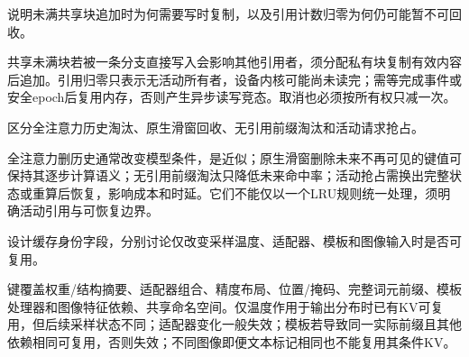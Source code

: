 \begin{exercises}
\begin{exercise} 说明未满共享块追加时为何需要写时复制，以及引用计数归零为何仍可能暂不可回收。

\begin{solution}
共享未满块若被一条分支直接写入会影响其他引用者，须分配私有块复制有效内容后追加。引用归零只表示无活动所有者，设备内核可能尚未读完；需等完成事件或安全epoch后复用内存，否则产生异步读写竞态。取消也必须按所有权只减一次。
\end{solution}
\end{exercise}

\begin{exercise} 区分全注意力历史淘汰、原生滑窗回收、无引用前缀淘汰和活动请求抢占。

\begin{solution}
全注意力删历史通常改变模型条件，是近似；原生滑窗删除未来不再可见的键值可保持其逐步计算语义；无引用前缀淘汰只降低未来命中率；活动抢占需换出完整状态或重算后恢复，影响成本和时延。它们不能仅以一个LRU规则统一处理，须明确活动引用与可恢复边界。
\end{solution}
\end{exercise}

\begin{exercise} 设计缓存身份字段，分别讨论仅改变采样温度、适配器、模板和图像输入时是否可复用。

\begin{solution}
键覆盖权重/结构摘要、适配器组合、精度布局、位置/掩码、完整词元前缀、模板处理器和图像特征依赖、共享命名空间。仅温度作用于输出分布时已有KV可复用，但后续采样状态不同；适配器变化一般失效；模板若导致同一实际前缀且其他依赖相同可复用，否则失效；不同图像即便文本标记相同也不能复用其条件KV。
\end{solution}
\end{exercise}

\end{exercises}
